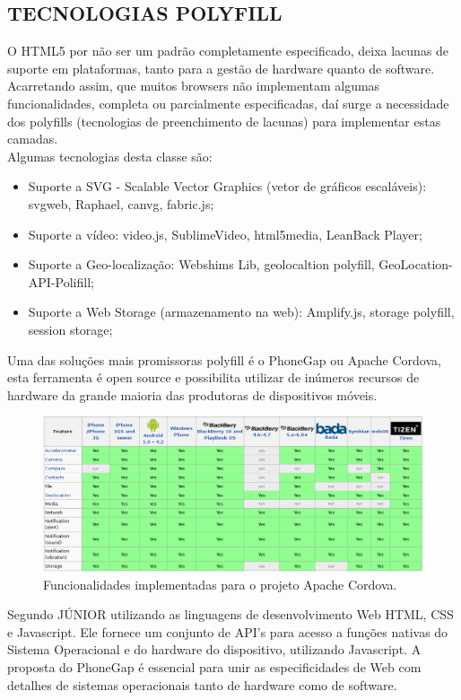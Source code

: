 \documentclass{article}
\begin{document}
\subsection{TECNOLOGIAS POLYFILL}

O HTML5 por não ser um padrão completamente especificado, deixa lacunas de suporte em plataformas, tanto para a gestão de hardware quanto de software. Acarretando assim, que muitos browsers não implementam algumas funcionalidades, completa ou parcialmente especificadas, daí surge a necessidade dos polyfills (tecnologias de preenchimento de lacunas) para implementar estas camadas.
\\
Algumas tecnologias desta classe são:

\begin{itemize}
    \item Suporte a SVG - Scalable Vector Graphics (vetor de gráficos escaláveis): svgweb, Raphael, canvg, fabric.js;

    \item Suporte a vídeo: video.js, SublimeVideo, html5media, LeanBack Player;

    \item Suporte a Geo-localização: Webshims Lib, geolocaltion polyfill, GeoLocation-API-Polifill;

    \item Suporte a Web Storage (armazenamento na web): Amplify.js, storage polyfill, session storage;
\end{itemize}

Uma das soluções mais promissoras polyfill é o PhoneGap ou Apache Cordova, esta ferramenta é open source e possibilita utilizar de inúmeros recursos de hardware da grande maioria das produtoras de dispositivos móveis.


\begin{figure}[!htbp]
    \begin{center}
        \includegraphics[width=\textwidth]{asset/img/cordovaFeatures.jpg}
               \caption{Funcionalidades implementadas para o projeto Apache Cordova.\label{fig:Cordova}}
    \end{center}
\end{figure}
Segundo JÚNIOR  utilizando as linguagens de desenvolvimento Web HTML, CSS e Javascript. Ele fornece um conjunto de API's para acesso a funções nativas do Sistema Operacional e do hardware do dispositivo, utilizando Javascript. A proposta do PhoneGap é essencial para unir as especificidades de Web com detalhes de sistemas operacionais tanto de hardware como de software.
\end{document}
